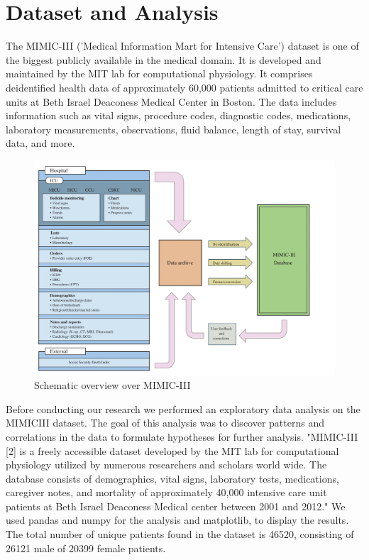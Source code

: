 \documentclass[11pt, a4paper]{book}
\begin{document}
\chapter{Dataset and Analysis}
The MIMIC-III ('Medical Information Mart for Intensive Care') dataset is one of the biggest publicly available in the medical domain. It is developed and maintained by the MIT lab for computational physiology. It comprises deidentified health data of approximately 60,000 patients admitted to critical care units at Beth Israel Deaconess Medical Center in Boston. The data includes information such as vital signs, procedure codes, diagnostic codes, medications, laboratory measurements, observations, fluid balance, length of stay, survival data, and more. 
\begin{figure}
  \begin{center}
  \includegraphics[width=1\textwidth]{img/mimicIII-schema.png}
  \caption{Schematic overview over MIMIC-III \cite{NAT}}
  \label{fig:mimicIII-schema}
  \end{center}
\end{figure}
Before conducting our research we performed an exploratory data analysis on the MIMICIII dataset. The goal of this analysis was to discover patterns and correlations in the data to formulate hypotheses for further analysis. "MIMIC-III [2] is a freely accessible dataset developed by the MIT lab for computational physiology utilized by numerous researchers and scholars world wide. The database consists of demographics, vital signs, laboratory tests, medications, caregiver notes, and mortality of approximately 40,000 intensive care unit patients at Beth Israel Deaconess Medical center between 2001 and 2012." \cite{arya2019exploratory}
We used pandas and numpy for the analysis and matplotlib, to display the results.
The total number of unique patients found in the dataset is 46520, consisting of 26121 male of 20399 female patients.
\end{document}
